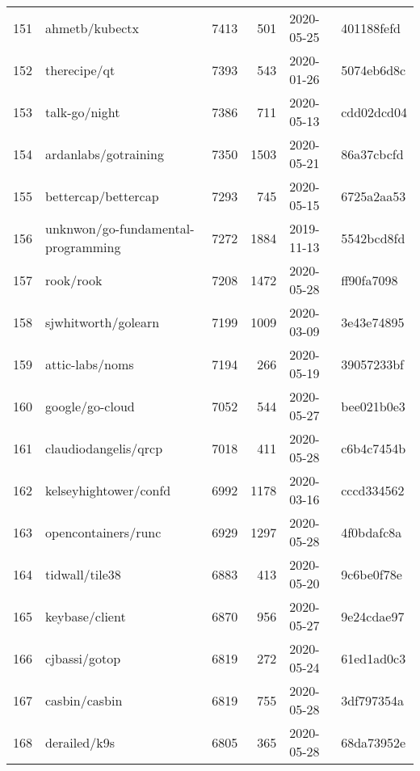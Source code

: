 \begin{longtable}{llrrll}
    151 &                                     ahmetb/kubectx &   7413 &    501 & 2020-05-25 &  401188fefd \\
    152 &                                       therecipe/qt &   7393 &    543 & 2020-01-26 &  5074eb6d8c \\
    153 &                                      talk-go/night &   7386 &    711 & 2020-05-13 &  cdd02dcd04 \\
    154 &                               ardanlabs/gotraining &   7350 &   1503 & 2020-05-21 &  86a37cbcfd \\
    155 &                                bettercap/bettercap &   7293 &    745 & 2020-05-15 &  6725a2aa53 \\
    156 &                 unknwon/go-fundamental-programming &   7272 &   1884 & 2019-11-13 &  5542bcd8fd \\
    157 &                                          rook/rook &   7208 &   1472 & 2020-05-28 &  ff90fa7098 \\
    158 &                                sjwhitworth/golearn &   7199 &   1009 & 2020-03-09 &  3e43e74895 \\
    159 &                                    attic-labs/noms &   7194 &    266 & 2020-05-19 &  39057233bf \\
    160 &                                    google/go-cloud &   7052 &    544 & 2020-05-27 &  bee021b0e3 \\
    161 &                               claudiodangelis/qrcp &   7018 &    411 & 2020-05-28 &  c6b4c7454b \\
    162 &                              kelseyhightower/confd &   6992 &   1178 & 2020-03-16 &  cccd334562 \\
    163 &                                opencontainers/runc &   6929 &   1297 & 2020-05-28 &  4f0bdafc8a \\
    164 &                                     tidwall/tile38 &   6883 &    413 & 2020-05-20 &  9c6be0f78e \\
    165 &                                     keybase/client &   6870 &    956 & 2020-05-27 &  9e24cdae97 \\
    166 &                                      cjbassi/gotop &   6819 &    272 & 2020-05-24 &  61ed1ad0c3 \\
    167 &                                      casbin/casbin &   6819 &    755 & 2020-05-28 &  3df797354a \\
    168 &                                       derailed/k9s &   6805 &    365 & 2020-05-28 &  68da73952e \\

\end{longtable}

